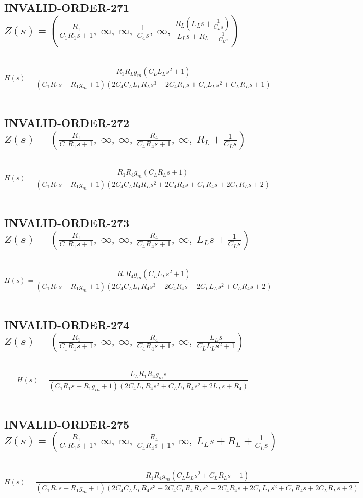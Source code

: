 \documentclass{article}
\begin{document}
\subsection{INVALID-ORDER-271 $Z(s) = \left( \frac{R_{1}}{C_{1} R_{1} s + 1}, \  \infty, \  \infty, \  \frac{1}{C_{4} s}, \  \infty, \  \frac{R_{L} \left(L_{L} s + \frac{1}{C_{L} s}\right)}{L_{L} s + R_{L} + \frac{1}{C_{L} s}}\right)$ } \ 
\textbf{\[H(s) = \frac{R_{1} R_{L} g_{m} \left(C_{L} L_{L} s^{2} + 1\right)}{\left(C_{1} R_{1} s + R_{1} g_{m} + 1\right) \left(2 C_{4} C_{L} L_{L} R_{L} s^{3} + 2 C_{4} R_{L} s + C_{L} L_{L} s^{2} + C_{L} R_{L} s + 1\right)}\] } \ 
\subsection{INVALID-ORDER-272 $Z(s) = \left( \frac{R_{1}}{C_{1} R_{1} s + 1}, \  \infty, \  \infty, \  \frac{R_{4}}{C_{4} R_{4} s + 1}, \  \infty, \  R_{L} + \frac{1}{C_{L} s}\right)$ } \ 
\textbf{\[H(s) = \frac{R_{1} R_{4} g_{m} \left(C_{L} R_{L} s + 1\right)}{\left(C_{1} R_{1} s + R_{1} g_{m} + 1\right) \left(2 C_{4} C_{L} R_{4} R_{L} s^{2} + 2 C_{4} R_{4} s + C_{L} R_{4} s + 2 C_{L} R_{L} s + 2\right)}\] } \ 
\subsection{INVALID-ORDER-273 $Z(s) = \left( \frac{R_{1}}{C_{1} R_{1} s + 1}, \  \infty, \  \infty, \  \frac{R_{4}}{C_{4} R_{4} s + 1}, \  \infty, \  L_{L} s + \frac{1}{C_{L} s}\right)$ } \ 
\textbf{\[H(s) = \frac{R_{1} R_{4} g_{m} \left(C_{L} L_{L} s^{2} + 1\right)}{\left(C_{1} R_{1} s + R_{1} g_{m} + 1\right) \left(2 C_{4} C_{L} L_{L} R_{4} s^{3} + 2 C_{4} R_{4} s + 2 C_{L} L_{L} s^{2} + C_{L} R_{4} s + 2\right)}\] } \ 
\subsection{INVALID-ORDER-274 $Z(s) = \left( \frac{R_{1}}{C_{1} R_{1} s + 1}, \  \infty, \  \infty, \  \frac{R_{4}}{C_{4} R_{4} s + 1}, \  \infty, \  \frac{L_{L} s}{C_{L} L_{L} s^{2} + 1}\right)$ } \ 
\textbf{\[H(s) = \frac{L_{L} R_{1} R_{4} g_{m} s}{\left(C_{1} R_{1} s + R_{1} g_{m} + 1\right) \left(2 C_{4} L_{L} R_{4} s^{2} + C_{L} L_{L} R_{4} s^{2} + 2 L_{L} s + R_{4}\right)}\] } \ 
\subsection{INVALID-ORDER-275 $Z(s) = \left( \frac{R_{1}}{C_{1} R_{1} s + 1}, \  \infty, \  \infty, \  \frac{R_{4}}{C_{4} R_{4} s + 1}, \  \infty, \  L_{L} s + R_{L} + \frac{1}{C_{L} s}\right)$ } \ 
\textbf{\[H(s) = \frac{R_{1} R_{4} g_{m} \left(C_{L} L_{L} s^{2} + C_{L} R_{L} s + 1\right)}{\left(C_{1} R_{1} s + R_{1} g_{m} + 1\right) \left(2 C_{4} C_{L} L_{L} R_{4} s^{3} + 2 C_{4} C_{L} R_{4} R_{L} s^{2} + 2 C_{4} R_{4} s + 2 C_{L} L_{L} s^{2} + C_{L} R_{4} s + 2 C_{L} R_{L} s + 2\right)}\] } \ 
\end{document}
